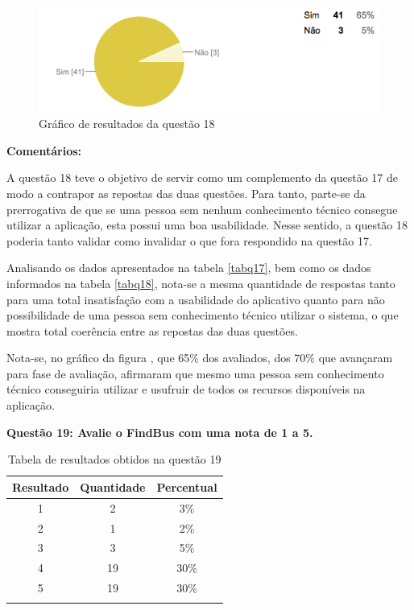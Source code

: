 \begin{figure}[h]
\begin{center}
  \includegraphics[width=16cm]{images/graficos/questao18.png}
  \caption{Gráfico de resultados da questão 18}
  \label{fig:questao18}
\end{center}
\end{figure}

\textbf{Comentários:}

A questão 18 teve o objetivo de servir como um complemento da questão 17 de modo a contrapor as repostas das duas questões. Para tanto, parte-se da prerrogativa de que se uma pessoa sem nenhum conhecimento técnico consegue utilizar a aplicação, esta possui uma boa usabilidade. Nesse sentido, a questão 18 poderia tanto validar como invalidar o que fora respondido na questão 17.
	
Analisando os dados apresentados na tabela \ref{tabq17}, bem como os dados informados na tabela \ref{tabq18}, nota-se a mesma quantidade de respostas tanto para uma total insatisfação com a usabilidade do aplicativo quanto para não possibilidade de uma pessoa sem conhecimento técnico utilizar o sistema, o que mostra total coerência entre as repostas das duas questões.
	
Nota-se, no gráfico da figura , que 65\% dos avaliados, dos 70\% que avançaram para fase de avaliação, afirmaram que mesmo uma pessoa sem conhecimento técnico conseguiria utilizar e usufruir de todos os recursos disponíveis na aplicação.\newline

\textbf{Questão 19: Avalie o FindBus com uma nota de 1 a 5.}


\begin{center}
\begin{longtable}{c|c|c}
\hline
    \multicolumn{1}{c}{\textbf{Resultado}} & \multicolumn{1}{c}{\textbf{Quantidade}} & \multicolumn{1}{c}{\textbf{Percentual}} \\
\hline
    1 & 2 &  3\%\\
    \hline
    2 & 1 & 2\%\\
    \hline
    3 & 3 &  5\%\\
    \hline
    4 & 19 & 30\%\\
    \hline
    5 & 19 & 30\%\\
    \hline
\caption{Tabela de resultados obtidos na questão 19}
\label{tabq19}
\end{longtable}
\end{center}

